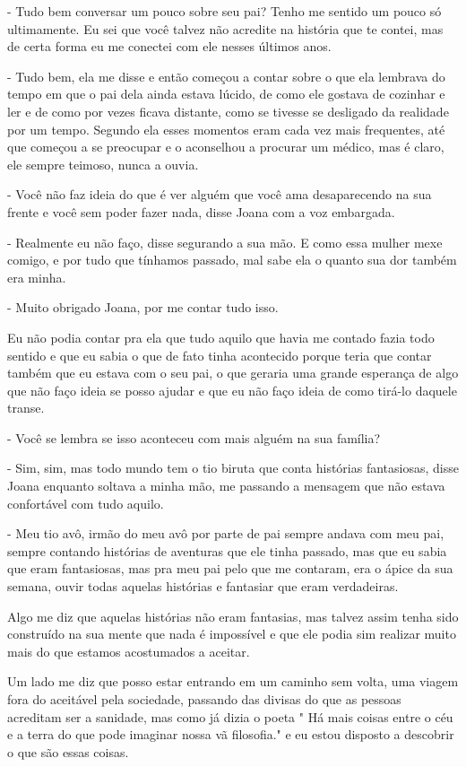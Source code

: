 - Tudo bem conversar um pouco sobre seu pai? Tenho me sentido um pouco só ultimamente. Eu sei que você talvez não acredite na história que te contei, mas de certa forma eu me conectei com ele nesses últimos anos.

- Tudo bem, ela me disse e então começou a contar sobre o que ela lembrava do tempo em que o pai dela ainda estava lúcido, de como ele gostava de cozinhar e ler e de como por vezes ficava distante, como se tivesse se desligado da realidade por um tempo. Segundo ela esses momentos eram cada vez mais frequentes, até que começou a se preocupar e o aconselhou a procurar um médico, mas é claro, ele sempre teimoso, nunca a ouvia.

- Você não faz ideia do que é ver alguém que você ama desaparecendo na sua frente e você sem poder fazer nada, disse Joana com a voz embargada.

- Realmente eu não faço, disse segurando a sua mão. E como essa mulher mexe comigo, e por tudo que tínhamos passado, mal sabe ela o quanto sua dor também era minha.

- Muito obrigado Joana, por me contar tudo isso.

Eu não podia contar pra ela que tudo aquilo que havia me contado fazia todo sentido e que eu sabia o que de fato tinha acontecido porque teria que contar também que eu estava com o seu pai, o que geraria uma grande esperança de algo que não faço ideia se posso ajudar e que eu não faço ideia de como tirá-lo daquele transe.

- Você se lembra se isso aconteceu com mais alguém na sua família?

- Sim, sim, mas todo mundo tem o tio biruta que conta histórias fantasiosas, disse Joana enquanto soltava a minha mão, me passando a mensagem que não estava confortável com tudo aquilo.

- Meu tio avô, irmão do meu avô por parte de pai sempre andava com meu pai, sempre contando histórias de aventuras que ele tinha passado, mas que eu sabia que eram fantasiosas, mas pra meu pai pelo que me contaram, era o ápice da sua semana, ouvir todas aquelas histórias e fantasiar que eram verdadeiras.

Algo me diz que aquelas histórias não eram fantasias, mas talvez assim tenha sido construído na sua mente que nada é impossível e que ele podia sim realizar muito mais do que estamos acostumados a aceitar.

Um lado me diz que posso estar entrando em um caminho sem volta, uma viagem fora do aceitável pela sociedade, passando das divisas do que as pessoas acreditam ser a sanidade, mas como já dizia o poeta " Há mais coisas entre o céu e a terra do que pode imaginar nossa vã filosofia." e eu estou disposto a descobrir o que são essas coisas.

